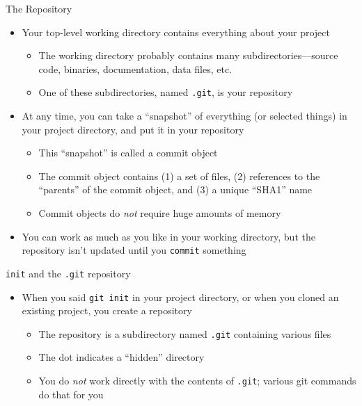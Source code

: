 \documentclass[aspectratio=169,11pt,t]{beamer}
\newcommand{\hl}[1]{\textcolor{accent}{#1}}              %
\newcommand{\cmd}[1]{\textcolor{cmdcol}{\texttt{#1}}}    %
\begin{document}
\begin{frame}{The Repository}
  \small
  \begin{itemize}
    \item Your top-level \hl{working directory} contains everything about your project
      \begin{itemize}
        \item The working directory probably contains many subdirectories---source code,
              binaries, documentation, data files, etc.
        \item One of these subdirectories, named \hl{\texttt{.git}}, is your repository
      \end{itemize}
    \item At any time, you can take a ``snapshot'' of everything (or selected things) in your
          project directory, and put it in your repository
      \begin{itemize}
        \item This ``snapshot'' is called a \hl{commit object}
        \item The commit object contains (1) a set of files, (2) references to the ``parents'' of
              the commit object, and (3) a unique ``SHA1'' name
        \item Commit objects do \emph{not} require huge amounts of memory
      \end{itemize}
    \item You can work as much as you like in your working directory, but the repository isn't
          updated until you \textcolor{bulletblue}{\texttt{commit}} something
  \end{itemize}
\end{frame}

\begin{frame}{\texttt{init} and the \texttt{.git} repository}
  \vskip3mm
  \begin{itemize}
    \item When you said \cmd{git init} in your project directory, or when you cloned an existing
          project, you create a repository
      \begin{itemize}
        \item The repository is a subdirectory named \cmd{.git} containing various files
        \item The \hl{dot} indicates a ``\hl{hidden}'' directory
        \item You \hl{do} \textcolor{red!75!black}{\emph{not}} \hl{work directly with the contents of}
              \cmd{.git}; various git commands do that for you
      \end{itemize}
  \end{itemize}
\end{frame}
\end{document}
